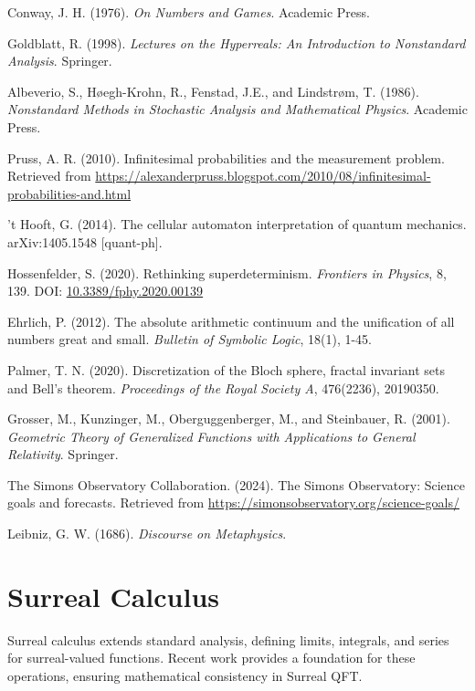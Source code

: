 \documentclass{article}
\begin{document}
\begin{thebibliography}{9}
 Conway, J. H. (1976). \emph{On Numbers and Games}. Academic Press.

 Goldblatt, R. (1998). \emph{Lectures on the Hyperreals: An Introduction to Nonstandard Analysis}. Springer.

 Albeverio, S., Høegh-Krohn, R., Fenstad, J.E., and Lindstrøm, T. (1986). \emph{Nonstandard Methods in Stochastic Analysis and Mathematical Physics}. Academic Press.

 Pruss, A. R. (2010). Infinitesimal probabilities and the measurement problem. Retrieved from \url{https://alexanderpruss.blogspot.com/2010/08/infinitesimal-probabilities-and.html}

 't Hooft, G. (2014). The cellular automaton interpretation of quantum mechanics. arXiv:1405.1548 [quant-ph].

 Hossenfelder, S. (2020). Rethinking superdeterminism. \emph{Frontiers in Physics}, 8, 139. DOI: \href{https://doi.org/10.3389/fphy.2020.00139}{10.3389/fphy.2020.00139}

 Ehrlich, P. (2012). The absolute arithmetic continuum and the unification of all numbers great and small. \emph{Bulletin of Symbolic Logic}, 18(1), 1-45.

 Palmer, T. N. (2020). Discretization of the Bloch sphere, fractal invariant sets and Bell's theorem. \emph{Proceedings of the Royal Society A}, 476(2236), 20190350.

 Grosser, M., Kunzinger, M., Oberguggenberger, M., and Steinbauer, R. (2001). \emph{Geometric Theory of Generalized Functions with Applications to General Relativity}. Springer.

 The Simons Observatory Collaboration. (2024). The Simons Observatory: Science goals and forecasts. Retrieved from \url{https://simonsobservatory.org/science-goals/}

 Leibniz, G. W. (1686). \emph{Discourse on Metaphysics}.
\end{thebibliography}

\appendix
\section{Surreal Calculus}
Surreal calculus extends standard analysis, defining limits, integrals, and series for surreal-valued functions. Recent work \cite{Ehrlich2012} provides a foundation for these operations, ensuring mathematical consistency in Surreal QFT.
\end{document}
